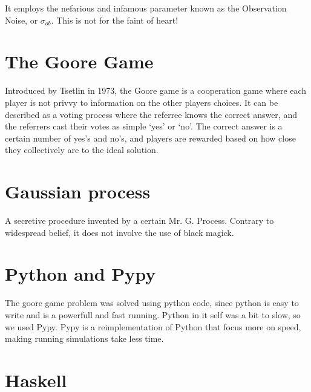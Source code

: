 It employs the nefarious and infamous parameter known as the Observation Noise, 
or $\sigma_{ob}$. This is not for the faint of heart!


\section{The Goore Game}
Introduced by Tsetlin in 1973, the Goore game is a cooperation game where each  
player is not privvy to information on the other players choices. It can be 
described as a voting process where the referree knows the correct answer, and 
the referrers cast their votes as simple ‘yes’ or ‘no’. The correct answer is a 
certain number of yes’s and no’s, and players are rewarded based on how close 
they collectively are to the ideal solution.



\section{Gaussian process}
A secretive procedure invented by a certain Mr. G. Process. Contrary to 
widespread belief, it does not involve the use of black magick.

\section{Python and Pypy}
The goore game problem was solved using python code, since python is easy to write
and is a powerfull and fast running. Python in it self was a bit to slow, so we used
Pypy. Pypy is a reimplementation of Python that focus more on speed, making running
simulations take less time.

\section{Haskell}



